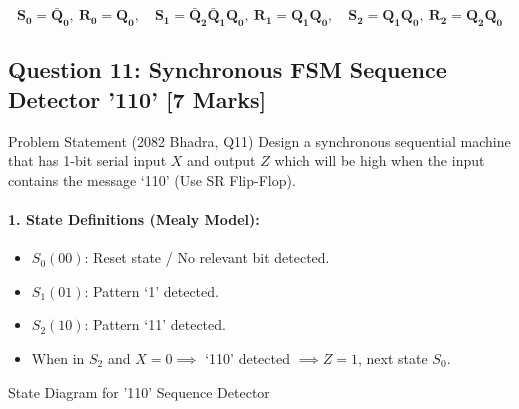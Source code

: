 \documentclass[11pt,a4paper,oneside]{book}
\begin{document}
\begin{answerbox}
$$\mathbf{S_0 = \bar{Q}_0, \ R_0 = Q_0, \quad S_1 = \bar{Q}_2 \bar{Q}_1 Q_0, \ R_1 = Q_1 Q_0, \quad S_2 = Q_1 Q_0, \ R_2 = Q_2 Q_0}$$
\end{answerbox}

\vspace{0.6cm}

\subsection{Question 11: Synchronous FSM Sequence Detector '110' [7 Marks]}
\begin{questionbox}{Problem Statement (2082 Bhadra, Q11)}
Design a synchronous sequential machine that has 1-bit serial input $X$ and output $Z$ which will be high when the input contains the message `110' (Use SR Flip-Flop).
\end{questionbox}

\paragraph{1. State Definitions (Mealy Model):}
\begin{itemize}
  \item $S_0 (00)$: Reset state / No relevant bit detected.
  \item $S_1 (01)$: Pattern `1' detected.
  \item $S_2 (10)$: Pattern `11' detected.
  \item When in $S_2$ and $X=0 \implies$ `110' detected $\implies Z=1$, next state $S_0$.
\end{itemize}

\begin{schematicbox}{State Diagram for '110' Sequence Detector}
\centering
{}
\end{schematicbox}
\end{document}
